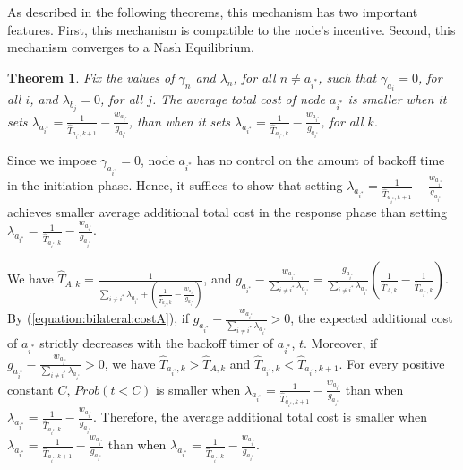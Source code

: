 \documentclass[11pt, conference]{IEEEtran}
\newtheorem{theorem}{Theorem}
\begin{document}
As described in the following theorems, this mechanism has two important features. First, this mechanism is compatible to the node's incentive. Second, this mechanism converges to a Nash Equilibrium. 



\begin{theorem} \label{theorem:distributed:incentiveA}
Fix the values of $\gamma_n$ and $\lambda_n$, for all $n\neq a_{i^*}$, such that $\gamma_{a_i}=0$, for all $i$, and $\lambda_{b_j}=0$, for all $j$. The average total cost of node $a_{i^*}$ is smaller when it sets $\lambda_{a_{i^*}}=\frac{1}{\hat{T}_{a_{i^*},k+1}}-\frac{w_{a_{i^*}}}{g_{a_{i^*}}}$, than when it sets $\lambda_{a_{i^*}}=\frac{1}{\hat{T}_{a_{i^*},k}}-\frac{w_{a_{i^*}}}{g_{a_{i^*}}}$, for all $k$.
\end{theorem}
\begin{IEEEproof}
Since we impose $\gamma_{a_{i^*}}=0$, node $a_{i^*}$ has no control on the amount of backoff time in the initiation phase. Hence, it suffices to show that setting $\lambda_{a_{i^*}}=\frac{1}{\hat{T}_{a_{i^*},k+1}}-\frac{w_{a_{i^*}}}{g_{a_{i^*}}}$ achieves smaller average additional total cost in the response phase than setting $\lambda_{a_{i^*}}=\frac{1}{\hat{T}_{a_{i^*},k}}-\frac{w_{a_{i^*}}}{g_{a_{i^*}}}$.

We have $\hat{T}_{A,k}=\frac{1}{\sum_{i\neq i^*}\lambda_{a_{i^*}}+(\frac{1}{\hat{T}_{a_{i^*},k}}-\frac{w_{a_{i^*}}}{g_{a_{i^*}}})}$, and $g_{a_{i^*}}-\frac{w_{a_{i^*}}}{\sum_{i\neq i^*}\lambda_{a_{i^*}}}=\frac{g_{a_{i^*}}}{\sum_{i\neq i^*}\lambda_{a_{i^*}}}(\frac{1}{\hat{T}_{A,k}}-\frac{1}{\hat{T}_{a_{i^*},k}})$. By (\ref{equation:bilateral:costA}), if $g_{a_{i^*}}-\frac{w_{a_{i^*}}}{\sum_{i\neq i^*}\lambda_{a_{i^*}}}>0$, the expected additional cost of $a_{i^*}$ strictly decreases with the backoff timer of $a_{i^*}$, $t$. Moreover, if $g_{a_{i^*}}-\frac{w_{a_{i^*}}}{\sum_{i\neq i^*}\lambda_{a_{i^*}}}>0$, we have $\hat{T}_{a_{i^*},k}>\hat{T}_{A,k}$ and $\hat{T}_{a_{i^*},k}<\hat{T}_{a_{i^*},k+1}$. For every positive constant $C$, $Prob(t<C)$ is smaller when $\lambda_{a_{i^*}}=\frac{1}{\hat{T}_{a_{i^*},k+1}}-\frac{w_{a_{i^*}}}{g_{a_{i^*}}}$ than when $\lambda_{a_{i^*}}=\frac{1}{\hat{T}_{a_{i^*},k}}-\frac{w_{a_{i^*}}}{g_{a_{i^*}}}$. Therefore, the average additional total cost is smaller when $\lambda_{a_{i^*}}=\frac{1}{\hat{T}_{a_{i^*},k+1}}-\frac{w_{a_{i^*}}}{g_{a_{i^*}}}$ than when $\lambda_{a_{i^*}}=\frac{1}{\hat{T}_{a_{i^*},k}}-\frac{w_{a_{i^*}}}{g_{a_{i^*}}}$.


\end{IEEEproof}
\end{document}
